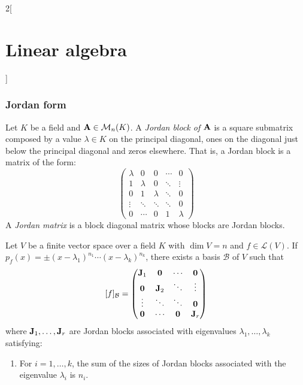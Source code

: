 \documentclass[../../../main.tex]{subfiles}
\begin{document}
\begin{multicols}{2}[\section{Linear algebra}]
  \subsubsection{Jordan form}
  \begin{definition}
    Let $K$ be a field and $\boldsymbol{\mathrm{A}}\in\mathcal{M}_n(K)$. A \textit{Jordan block of $\boldsymbol{\mathrm{A}}$} is a square submatrix composed by a value $\lambda\in K$ on the principal diagonal, ones on the diagonal just below the principal diagonal and zeros elsewhere. That is, a Jordan block is a matrix of the form:
    $$
      \begin{pmatrix}
        \lambda & 0       & 0       & \cdots & 0       \\
        1       & \lambda & 0       & \ddots & \vdots  \\
        0       & 1       & \lambda & \ddots & 0       \\
        \vdots  & \ddots  & \ddots  & \ddots & 0       \\
        0       & \cdots  & 0       & 1      & \lambda
      \end{pmatrix}
    $$
    A \textit{Jordan matrix} is a block diagonal matrix whose blocks are Jordan blocks.
  \end{definition}
  \begin{prop}\label{LA_jordan}
    Let $V$ be a finite vector space over a field $K$ with $\dim V=n$ and $f\in\mathcal{L}(V)$. If $p_f(x)=\pm(x-\lambda_1)^{n_1}\cdots(x-\lambda_k)^{n_k}$, there exists a basis $\mathcal{B}$ of $V$ such that
    $$[f]_{\mathcal{B}}=
      \begin{pmatrix}
        \boldsymbol{\mathrm{J}}_1 & \boldsymbol{\mathrm{0}}   & \cdots             & \boldsymbol{\mathrm{0}}   \\
        \boldsymbol{\mathrm{0}}   & \boldsymbol{\mathrm{J}}_2 & \ddots             & \vdots               \\
        \vdots               & \ddots               & \ddots             & \boldsymbol{\mathrm{0}}   \\
        \boldsymbol{\mathrm{0}}   & \cdots               & \boldsymbol{\mathrm{0}} & \boldsymbol{\mathrm{J}}_r \\
      \end{pmatrix}
    $$
    where $\boldsymbol{\mathrm{J}}_1,\ldots,\boldsymbol{\mathrm{J}}_r$ are Jordan blocks associated with eigenvalues $\lambda_1,\ldots,\lambda_k$ satisfying:
    \begin{enumerate}
      \item\label{LA_diag1} For $i=1,\ldots,k$, the sum of the sizes of Jordan blocks associated with the eigenvalue $\lambda_i$ is $n_i$.

\end{enumerate}
\end{prop}
\end{multicols}
\end{document}
